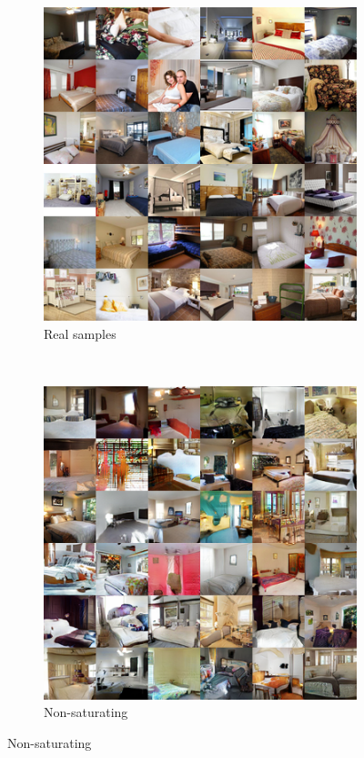 \documentclass{article} %
\theoremstyle{plain}
\newtheorem*{proposition 1*}{Proposition 1}
\begin{document}
\begin{appendices}
\begin{figure}[tb]
	\centering
	\begin{subfigure}[t]{0.45\textwidth}
		\centering
		\includegraphics[width=1\textwidth]{lsun_real.png}
		\caption{Real samples\label{fig:sample_lsun_real}}
	\end{subfigure}
	~
	\begin{subfigure}[t]{0.45\linewidth}
		\centering
		\includegraphics[width=1\textwidth]{lsun_logistic.png}
		\caption{Non-saturating\label{fig:sample_lsun_non_saturating}}
	\end{subfigure}
	

\end{figure}
\end{appendices}
\end{document}
